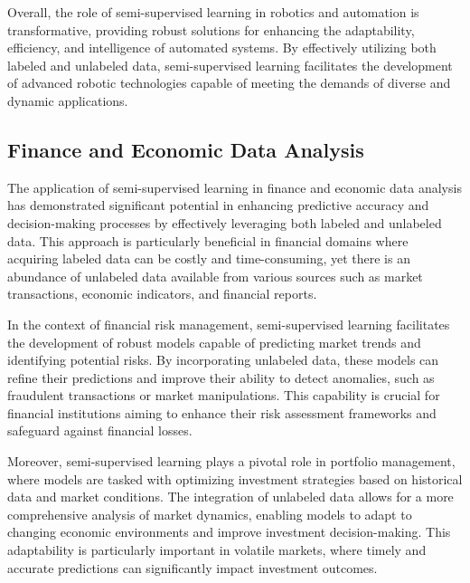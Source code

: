 Overall, the role of semi-supervised learning in robotics and automation is transformative, providing robust solutions for enhancing the adaptability, efficiency, and intelligence of automated systems. By effectively utilizing both labeled and unlabeled data, semi-supervised learning facilitates the development of advanced robotic technologies capable of meeting the demands of diverse and dynamic applications.



\subsection{Finance and Economic Data Analysis} \label{subsec:Finance and Economic Data Analysis}

The application of semi-supervised learning in finance and economic data analysis has demonstrated significant potential in enhancing predictive accuracy and decision-making processes by effectively leveraging both labeled and unlabeled data. This approach is particularly beneficial in financial domains where acquiring labeled data can be costly and time-consuming, yet there is an abundance of unlabeled data available from various sources such as market transactions, economic indicators, and financial reports.



In the context of financial risk management, semi-supervised learning facilitates the development of robust models capable of predicting market trends and identifying potential risks. By incorporating unlabeled data, these models can refine their predictions and improve their ability to detect anomalies, such as fraudulent transactions or market manipulations. This capability is crucial for financial institutions aiming to enhance their risk assessment frameworks and safeguard against financial losses.



Moreover, semi-supervised learning plays a pivotal role in portfolio management, where models are tasked with optimizing investment strategies based on historical data and market conditions. The integration of unlabeled data allows for a more comprehensive analysis of market dynamics, enabling models to adapt to changing economic environments and improve investment decision-making. This adaptability is particularly important in volatile markets, where timely and accurate predictions can significantly impact investment outcomes.



